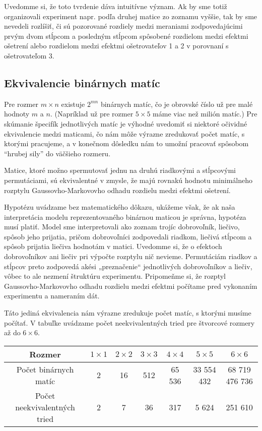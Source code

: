 Uvedomme si, že toto tvrdenie dáva intuitívne význam. Ak by sme totiž organizovali experiment napr. podľa druhej matice zo zoznamu vyššie, 
tak by sme nevedeli rozlíšiť, či sú pozorované rozdiely medzi meraniami zodpovedajúcimi prvým dvom stĺpcom a posledným stĺpcom spôsobené rozdielom medzi efektmi ošetrení
alebo rozdielom medzi efektmi ošetrovateľov 1 a 2 v porovnaní s ošetrovateľom 3.

\subsection{Ekvivalencie binárnych matíc}

Pre rozmer $m \times n$ existuje $2^{mn}$ binárnych matíc, čo je obrovské číslo už pre malé hodnoty $m$ a $n$.
(Napríklad už pre rozmer $5 \times 5$ máme viac než milión matíc.)
Pre skúmanie špecifík jednotlivých matíc je výhodné uvedomiť si niektoré očividné ekvivalencie medzi maticami, 
čo nám môže výrazne zredukovať počet matíc, s ktorými pracujeme,
 a v konečnom dôsledku nám to umožní pracovať spôsobom “hrubej sily” do väčšieho rozmeru.

\begin{hypoteza}

Matice, ktoré možno spermutovať jednu na druhú riadkovými a stĺpcovými permutáciami, sú ekvivalentné v zmysle, 
že majú rovnakú hodnotu minimálneho rozptylu Gaussovho-Markovovho odhadu rozdielu medzi efektmi ošetrení.

\end{hypoteza}

Hypotézu uvádzame bez matematického dôkazu, ukážeme však, že ak naša interpretácia modelu reprezentovaného binárnou maticou je správna,
hypotéza musí platiť. Model sme interpretovali ako zoznam trojíc dobrovoľník, liečivo, spôsob jeho prijatia, 
pričom dobrovoľníci zodpovedali riadkom, liečivá stĺpcom a spôsob prijatia liečiva hodnotám v matici. 
Uvedomme si, že o efektoch dobrovoľníkov ani liečiv pri výpočte rozptylu nič nevieme. 
Permutáciám riadkov a stĺpcov preto zodpovedá akési „preznačenie“ jednotlivých dobrovoľníkov a liečiv, 
vôbec to ale nezmení štruktúru experimentu. Pripomeňme si, že rozptyl Gaussovho-Markovovho odhadu rozdielu medzi efektmi
počítame pred vykonaním experimentu a nameraním dát.

Táto jediná ekvivalencia nám výrazne zredukuje počet matíc, s ktorými musíme počítať. 
V tabuľke uvádzame počet neekvivalentných tried pre štvorcové rozmery až do $6 \times 6$.

\begin{center}
\begin{tabular}{ |c|c|c|c|c|c|c| }
  \hline
  Rozmer & $1 \times 1$ & $2 \times 2$ & $3 \times 3$ & $4 \times 4$ & $5 \times 5$ & $6 \times 6$ \\ \hline
  Počet binárnych matíc & 2 & 16 & 512 & 65 536 & 33 554 432 & 68 719 476 736 \\ \hline
  Počet neekvivalentných tried & 2 & 7 & 36 & 317 & 5 624 & 251 610 \\ \hline
\end{tabular}
\end{center}


